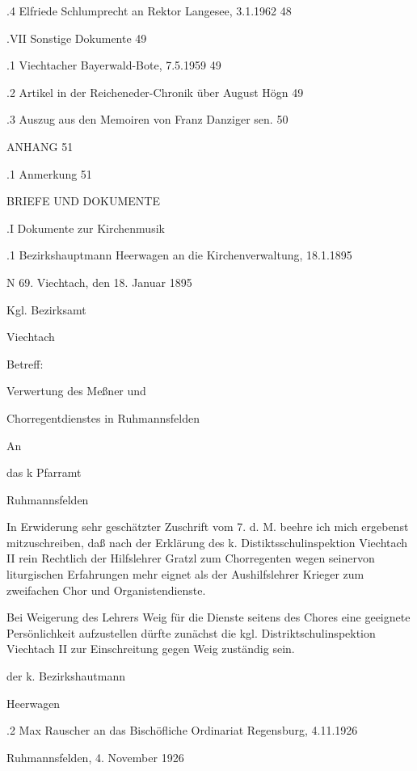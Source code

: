 \documentclass[12pt,a4pager]{book}
\begin{document}
.4 Elfriede Schlumprecht an Rektor Langesee, 3.1.1962   48

.VII Sonstige Dokumente 49

.1 Viechtacher Bayerwald-Bote, 7.5.1959 49

.2 Artikel in der Reicheneder-Chronik über August Högn  49

.3 Auszug aus den Memoiren von Franz Danziger sen.  50

ANHANG  51

.1 Anmerkung    51





BRIEFE UND DOKUMENTE

.I Dokumente zur Kirchenmusik

.1 Bezirkshauptmann Heerwagen an die Kirchenverwaltung, 18.1.1895

N 69.               Viechtach, den 18. Januar 1895



Kgl. Bezirksamt

Viechtach



Betreff:



Verwertung des Meßner und

Chorregentdienstes in Ruhmannsfelden



An

das k Pfarramt

Ruhmannsfelden



In Erwiderung sehr geschätzter Zuschrift vom 7. d. M. beehre ich mich ergebenst
mitzuschreiben, daß nach der Erklärung des k. Distiktsschulinspektion Viechtach
II rein Rechtlich der Hilfslehrer Gratzl zum Chorregenten wegen seinervon
liturgischen Erfahrungen mehr  eignet als der Aushilfslehrer Krieger zum
zweifachen Chor und Organistendienste.

Bei  Weigerung des Lehrers Weig für die Dienste seitens des Chores eine
geeignete Persönlichkeit aufzustellen dürfte zunächst die kgl.
Distriktschulinspektion Viechtach II zur Einschreitung gegen Weig zuständig
sein.



der k. Bezirkshautmann



Heerwagen

.2 Max Rauscher an das Bischöfliche Ordinariat Regensburg, 4.11.1926

Ruhmannsfelden, 4. November 1926
\end{document}
